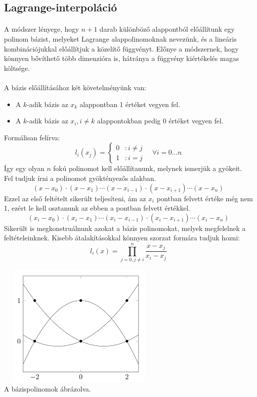 \documentclass{elteikthesis}
\begin{document}
\subsection{Lagrange-interpoláció}
\paragraph{}
A módszer lényege, hogy $n+1$ darab különböző alappontból előállítunk egy polinom bázist, melyeket Lagrange alappolinomoknak nevezünk, és a lineáris kombinációjukkal előállítjuk a közelítő függvényt. Előnye a módszernek, hogy könnyen bővíthető több dimenzióra is, hátránya a függvény kiértékelés magas költsége.
\paragraph{}
A bázis előállításához két követelményünk van:
\begin{itemize}
\item A $k$-adik bázis az $x_k$ alappontban 1 értéket vegyen fel.
\item A $k$-adik bázis az $x_i, i \neq k$ alappontokban pedig 0 értéket vegyen fel.
\end{itemize}
Formálisan felírva:
$$
	l_i(x_j) =
	\left\{
	  \begin{array}{lr}
	    0 & : i \neq j\\
	    1 & : i = j
	  \end{array}
	\right.
	\quad \forall i = 0 \dots n
$$
Így egy olyan $n$ fokú polinomot kell előállítanunk, melynek ismerjük a gyökeit. Fel tudjuk írni a polinomot gyöktényezős alakban.
$$(x-x_0)\cdot(x-x_1)\cdots(x-x_{i-1})\cdot(x-x_{i+1})\cdots(x-x_n)$$
Ezzel az első feltételt sikerült teljesíteni, ám az $x_i$ pontban felvett értéke még nem 1, ezért le kell osztanunk az ebben a pontban felvett értékkel.
$$(x_i-x_0)\cdot(x_i-x_1)\cdots(x_i-x_{i-1})\cdot(x_i-x_{i+1})\cdots(x_i-x_n)$$
Sikerült is megkonstruálnunk azokat a bázis polinomokat, melyek megfelelnek a feltételeinknek. Kisebb átalakításokkal könnyen szorzat formára tudjuk hozni:
$$l_i(x) = \prod_{j = 0, j \neq i}^{n} \frac{x-x_j}{x_i-x_j}$$
\begin{center}
\includegraphics[width=8cm,height=6cm]{pics/lagrange_basis}\\
{\footnotesize A bázispolinomok ábrázolva.}
\end{center}
\end{document}
